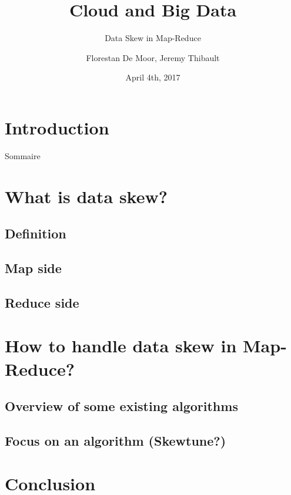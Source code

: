 \documentclass[11pt]{beamer}
\title{Cloud and Big Data}
\subtitle{Data Skew in Map-Reduce}
\date{April 4th, 2017}
\author{Florestan De Moor, Jeremy Thibault}
\begin{document}
\begin{frame}
\maketitle
\end{frame}

\section{Introduction}

\begin{frame}{Sommaire}
\tableofcontents
\end{frame}

\section{What is data skew?}

\subsection{Definition}

\subsection{Map side}

\subsection{Reduce side}

\begin{frame}
\end{frame}

\section{How to handle data skew in Map-Reduce?}

\subsection{Overview of some existing algorithms}

\subsection{Focus on an algorithm (Skewtune?)}

\begin{frame}
\end{frame}

\section{Conclusion}

\begin{frame}
\end{frame}
\end{document}
